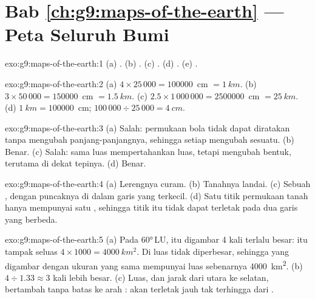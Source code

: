 \section*{Bab \ref{ch:g9:maps-of-the-earth} --- Peta Seluruh Bumi}

\begin{solution}{exo:g9:maps-of-the-earth:1}
(a) . (b) . (c) . (d) . (e) .
\end{solution}

\begin{solution}{exo:g9:maps-of-the-earth:2}
(a) $4 \times 25\,000 = \num{100000}$~cm $= \qty{1}{km}$. (b) $3 \times
50\,000 = \num{150000}$~cm $= \qty{1.5}{km}$. (c) $2.5 \times 1\,000\,000
= \num{2500000}$~cm $= \qty{25}{km}$. (d) $\qty{1}{km} = \num{100000}$~cm;
$100\,000 \div 25\,000 = \qty{4}{cm}$.
\end{solution}

\begin{solution}{exo:g9:maps-of-the-earth:3}
(a) Salah: permukaan bola tidak dapat diratakan tanpa mengubah
panjang-panjangnya, sehingga setiap  mengubah sesuatu. (b) Benar.
(c) Salah:  sama luas mempertahankan luas, tetapi mengubah bentuk,
terutama di dekat tepinya. (d) Benar.
\end{solution}

\begin{solution}{exo:g9:maps-of-the-earth:4}
(a) Lerengnya curam. (b) Tanahnya landai. (c) Sebuah , dengan
puncaknya di dalam garis yang terkecil. (d) Satu titik permukaan tanah
hanya mempunyai satu , sehingga titik itu tidak dapat terletak
pada dua garis yang  berbeda.
\end{solution}

\begin{solution}{exo:g9:maps-of-the-earth:5}
(a) Pada \ang{60}\,LU,  itu digambar 4 kali terlalu besar:  itu
tampak seluas $4 \times 1000 = \qty{4000}{km^2}$. Di  luas tidak
diperbesar, sehingga  yang digambar dengan ukuran yang sama mempunyai
luas sebenarnya \qty{4000}{km^2}. (b) $4 \div 1.33 \approx 3$ kali lebih
besar. (c) Luas, dan jarak dari utara ke selatan, bertambah tanpa batas ke
arah :  akan terletak jauh tak terhingga dari .
\end{solution}

